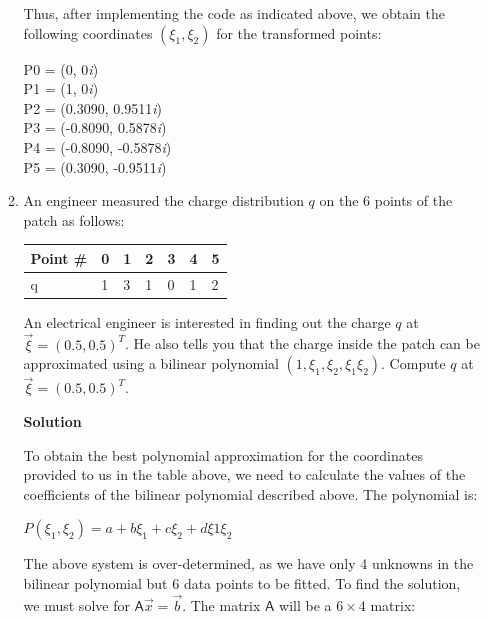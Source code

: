 \documentclass[a4paper, 11pt]{article}
\newcommand{\mat}[1]{\boldsymbol { \mathsf{#1}} }
\begin{document}
\begin{enumerate}
\begin{enumerate}[label=(\alph*)]
Thus, after implementing the code as indicated above, we obtain the following coordinates $(\xi_{1}, \xi_{2})$ for the transformed points:

\begin{center}
    P0 = (0, 0\textit{i})\\
    P1 = (1, 0\textit{i})\\
    P2 = (0.3090, 0.9511\textit{i})\\
    P3 = (-0.8090, 0.5878\textit{i})\\
    P4 = (-0.8090, -0.5878\textit{i})\\
    P5 = (0.3090, -0.9511\textit{i})\\
\end{center}



\item An engineer measured the charge distribution $q$ on the 6 points of the patch as follows:
    \begin{center}
    \begin{tabular}{ | l | l | l | l | l | l | l |}
    \hline
    Point \# & 0 & 1 & 2 & 3 & 4 & 5  \\ \hline
    q        & 1 & 3 & 1 & 0 & 1 & 2 \\ \hline
    \end{tabular}
    \end{center}
    An electrical engineer is interested in finding out the charge $q$ at $\vec \xi = (0.5, 0.5)^T$. He also tells you that the charge inside the patch can be approximated using a bilinear polynomial $(1, \xi_1, \xi_2,\xi_1\xi_2)$. Compute $q$ at $\vec \xi = (0.5, 0.5)^T$.
    
    \textbf{Solution}
    
    To obtain the best polynomial approximation for the coordinates provided to us in the table above, we need to calculate the values of the coefficients of the bilinear polynomial described above. The polynomial is:

    \begin{center}
        $ P(\xi_{1}, \xi_{2}) = a + b\xi_{1} + c\xi_{2} + d\xi{1}\xi_{2} $
    \end{center}

    The above system is over-determined, as we have only 4 unknowns in the bilinear polynomial but 6 data points to be fitted. To find the solution, we must solve for $\mat{A}\vec{x} = \vec{b}$. The matrix $\mat{A}$ will be a $6 \times 4$ matrix:
    

\end{enumerate}
\end{enumerate}
\end{document}
